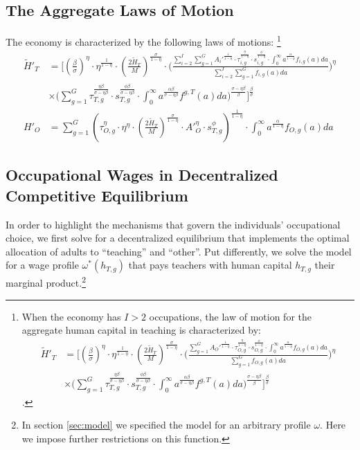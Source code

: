 \documentclass[onehalfspacing,11pt]{article}
\newtheorem{prp}{Proposition}
\begin{document}
\subsection{The Aggregate Laws of Motion}
The economy is characterized by the following laws of motions: \footnote{When the economy has $I>2$ occupations, the law of motion for the aggregate human capital in teaching is characterized by:
\begin{align*}
\widetilde{H}'_{T} & = \Bigg[ \left(\tfrac{\beta}{\sigma}\right)^\eta \cdot\eta^{\frac{1}{1-\eta}} \cdot \left(\tfrac{2\widetilde{H}_T}{M}\right)^{\frac{\sigma}{1-\eta}} \cdot \Bigg( \frac{\sum_{g=1}^G {A_O'}^\frac{1}{1-\eta}\cdot\tau_{O,g}^\frac{\eta}{1-\eta} \cdot s_{O,g}^\frac{\phi}{1-\eta}\cdot \int_0^\infty a^{\frac{\alpha}{1-\eta}} f_{O,g}(a)da}{\sum_{g=1}^G f_{O,g}(a)da} \Bigg)^\eta \nonumber\\
& \times \Bigg(\sum_{g=1}^G \tau_{T,g}^\frac{\eta\beta }{\sigma-\eta\beta } \cdot s_{T,g}^\frac{\phi\beta }{\sigma-\eta\beta } \cdot \int_0^\infty a^\frac{\alpha\beta}{\sigma-\eta\beta } f^{g,T}(a)da \Bigg)^\frac{\sigma-\eta\beta}{\beta} \Bigg]^\frac{\beta}{\sigma}
\end{align*}.
}
\begin{align}
\widetilde{H}'_{T} & = \Bigg[ \left(\tfrac{\beta}{\sigma}\right)^\eta \cdot\eta^{\frac{1}{1-\eta}} \cdot \left(\tfrac{2\widetilde{H}_T}{M}\right)^{\frac{\sigma}{1-\eta}} \cdot \Bigg( \frac{\sum_{i=2}^I \sum_{g=1}^G {A_i'}^\frac{1}{1-\eta}\cdot\tau_{i,g}^\frac{\eta}{1-\eta} \cdot s_{i,g}^\frac{\phi}{1-\eta}\cdot \int_0^\infty a^{\frac{\alpha}{1-\eta}} f_{i,g}(a)da}{\sum_{i=2}^I \sum_{g=1}^G f_{i,g}(a)da} \Bigg)^\eta \nonumber\\
& \times \Bigg(\sum_{g=1}^G \tau_{T,g}^\frac{\eta\beta }{\sigma-\eta\beta } \cdot s_{T,g}^\frac{\phi\beta }{\sigma-\eta\beta } \cdot \int_0^\infty a^\frac{\alpha\beta}{\sigma-\eta\beta } f^{g,T}(a)da \Bigg)^\frac{\sigma-\eta\beta}{\beta} \Bigg]^\frac{\beta}{\sigma}\\
{H}'_{O} & = \sum_{g=1}^G \left( \tau_{O,g}^\eta \cdot \eta^\eta \cdot \left(\tfrac{2\widetilde{H}_T}{M}\right)^\frac{\sigma}{1-\eta}\cdot {A}'_O^\eta \cdot s_{T,g}^\phi \right)^\frac{1}{1-\eta}\cdot \int_0^\infty a^{\frac{\alpha}{1-\eta}} f_{O,g}(a)da
\end{align}

\subsection{Occupational Wages in Decentralized Competitive Equilibrium}
In order to highlight the mechanisms that govern the individuals' occupational choice, we first solve for a decentralized equilibrium that implements the optimal allocation of adults to ``teaching'' and ``other''. Put differently, we solve the model for a wage profile $\omega^*(h_{T,g})$ that pays teachers with human capital $h_{T,g}$ their marginal product.\footnote{In section \ref{sec:model} we specified the model for an arbitrary profile $\omega$. Here we impose further restrictions on this function.}
\end{document}
